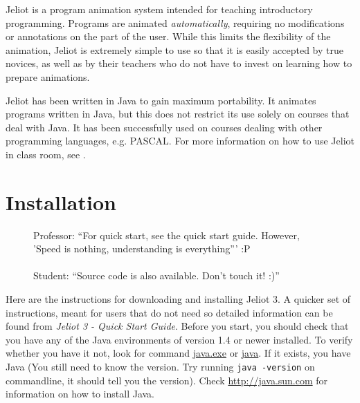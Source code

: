 \documentclass[a4paper,11pt,english]{article}
\newcommand{\jel}{Jeliot}
\newcommand{\file}{\url}
\newcommand{\p}[1]{\texttt{#1}}
\begin{document}
\jel{} is a program animation system intended for teaching introductory programming. Programs are animated \emph{automatically}, requiring no modifications or annotations on the part of the user. While this limits the flexibility of the animation, \jel{} is extremely simple to use so that it is easily accepted by true novices, as well as by their teachers who do not have to invest on learning how to prepare animations.

\jel{} has been written in Java to gain maximum portability. It animates programs written in Java, but this does not restrict its use solely on courses that deal with Java. It has been successfully used on courses dealing with other programming languages, e.g. PASCAL. For more information on how to use \jel{} in class room, see \cite{ronit}.



\section{Installation}

\begin{figure}
\vspace{-13pt}
Professor: ``For quick start, see the quick start guide. However, 'Speed is nothing, understanding is everything''' :P \\ \\
Student: ``Source code is also available. Don't touch it! :)''
\end{figure}

Here are the instructions for downloading and installing \jel{} 3. A quicker set of instructions, meant for users that do not need so detailed information can be found from \emph{Jeliot 3 - Quick Start Guide}. Before you start, you should check that you have any of the Java environments of version 1.4 or newer installed. To verify whether you have it not, look for command \file{java.exe} or \file{java}. If it exists, you have Java (You still need to know the version. Try running \p{java -version} on commandline, it should tell you the version). Check \url{http://java.sun.com} for information on how to install Java.
\end{document}
